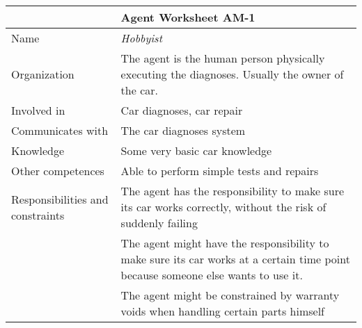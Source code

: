 \noindent
\begin{tabular} {|>{\colleft}p{3cm}|>{\colleft}p{8cm}|}\hline
{\bf Agent Model} 				& {\bf Agent Worksheet AM-1} 															\\ \hline \hline
\sc Name 						& {\em Hobbyist} 																	\\ \hline
\sc Organization 					& The agent is the human person physically executing the diagnoses. Usually the owner of the car.			\\ \hline
\sc Involved in 					& Car diagnoses, car repair 															\\ \hline
\sc Communicates with 				& The car diagnoses system															\\ \hline
\sc Knowledge 					& Some very basic car knowledge 														\\ \hline
\sc Other competences 				& Able to perform simple tests and repairs 												\\ \hline
\sc Responsibilities and constraints 	& The agent has the responsibility to make sure its car works correctly, without the risk of suddenly failing	\\
							& The agent might have the responsibility to make sure its car works at a certain time point because someone else 
							  wants to use it.																\\
						 	& The agent might be constrained by warranty voids when handling certain parts himself					\\ \hline
\end{tabular}